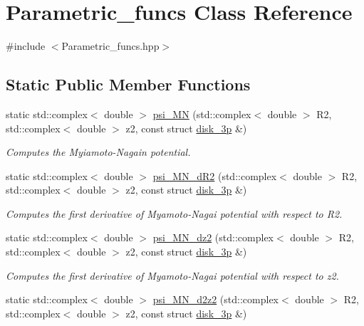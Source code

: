 \hypertarget{classParametric__funcs}{}\section{Parametric\+\_\+funcs Class Reference}
\label{classParametric__funcs}


{\ttfamily \#include $<$Parametric\+\_\+funcs.\+hpp$>$}

\subsection*{Static Public Member Functions}
\begin{DoxyCompactItemize}
\item 
static std\+::complex$<$ double $>$ \hyperlink{classParametric__funcs_a63fbb6aed4d72b75e8136365805404f6}{psi\+\_\+\+MN} (std\+::complex$<$ double $>$ R2, std\+::complex$<$ double $>$ z2, const struct \hyperlink{structdisk__3p}{disk\+\_\+3p} \&)
\begin{DoxyCompactList}\small\item\em Computes the Myiamoto-\/\+Nagain potential. \end{DoxyCompactList}\item 
static std\+::complex$<$ double $>$ \hyperlink{classParametric__funcs_a9835569f87964f0dad32a23d6a43a387}{psi\+\_\+\+M\+N\+\_\+d\+R2} (std\+::complex$<$ double $>$ R2, std\+::complex$<$ double $>$ z2, const struct \hyperlink{structdisk__3p}{disk\+\_\+3p} \&)
\begin{DoxyCompactList}\small\item\em Computes the first derivative of Myamoto-\/\+Nagai potential with respect to R2. \end{DoxyCompactList}\item 
static std\+::complex$<$ double $>$ \hyperlink{classParametric__funcs_a2bea359cc13f4f6beecdf0b1da8de868}{psi\+\_\+\+M\+N\+\_\+dz2} (std\+::complex$<$ double $>$ R2, std\+::complex$<$ double $>$ z2, const struct \hyperlink{structdisk__3p}{disk\+\_\+3p} \&)
\begin{DoxyCompactList}\small\item\em Computes the first derivative of Myamoto-\/\+Nagai potential with respect to z2. \end{DoxyCompactList}\item 
static std\+::complex$<$ double $>$ \hyperlink{classParametric__funcs_afa840a39017db2163e9330f983e1558b}{psi\+\_\+\+M\+N\+\_\+d2z2} (std\+::complex$<$ double $>$ R2, std\+::complex$<$ double $>$ z2, const struct \hyperlink{structdisk__3p}{disk\+\_\+3p} \&)

\end{DoxyCompactItemize}
